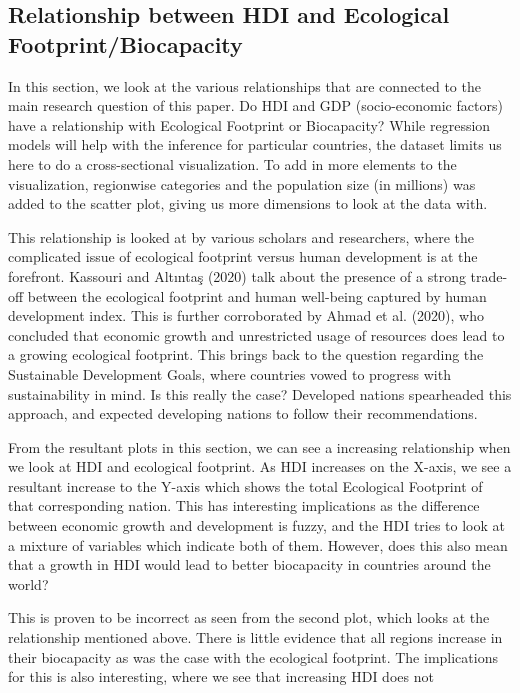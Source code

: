 \documentclass[
]{article}
\begin{document}
\hypertarget{relationship-between-hdi-and-ecological-footprintbiocapacity}{%
\subsection{Relationship between HDI and Ecological
Footprint/Biocapacity}\label{relationship-between-hdi-and-ecological-footprintbiocapacity}}

In this section, we look at the various relationships that are connected
to the main research question of this paper. Do HDI and GDP
(socio-economic factors) have a relationship with Ecological Footprint
or Biocapacity? While regression models will help with the inference for
particular countries, the dataset limits us here to do a cross-sectional
visualization. To add in more elements to the visualization, regionwise
categories and the population size (in millions) was added to the
scatter plot, giving us more dimensions to look at the data with.

This relationship is looked at by various scholars and researchers,
where the complicated issue of ecological footprint versus human
development is at the forefront. Kassouri and Altıntaş (2020) talk about
the presence of a strong trade-off between the ecological footprint and
human well-being captured by human development index. This is further
corroborated by Ahmad et al. (2020), who concluded that economic growth
and unrestricted usage of resources does lead to a growing ecological
footprint. This brings back to the question regarding the Sustainable
Development Goals, where countries vowed to progress with sustainability
in mind. Is this really the case? Developed nations spearheaded this
approach, and expected developing nations to follow their
recommendations.

From the resultant plots in this section, we can see a increasing
relationship when we look at HDI and ecological footprint. As HDI
increases on the X-axis, we see a resultant increase to the Y-axis which
shows the total Ecological Footprint of that corresponding nation. This
has interesting implications as the difference between economic growth
and development is fuzzy, and the HDI tries to look at a mixture of
variables which indicate both of them. However, does this also mean that
a growth in HDI would lead to better biocapacity in countries around the
world?

This is proven to be incorrect as seen from the second plot, which looks
at the relationship mentioned above. There is little evidence that all
regions increase in their biocapacity as was the case with the
ecological footprint. The implications for this is also interesting,
where we see that increasing HDI does not
\end{document}
